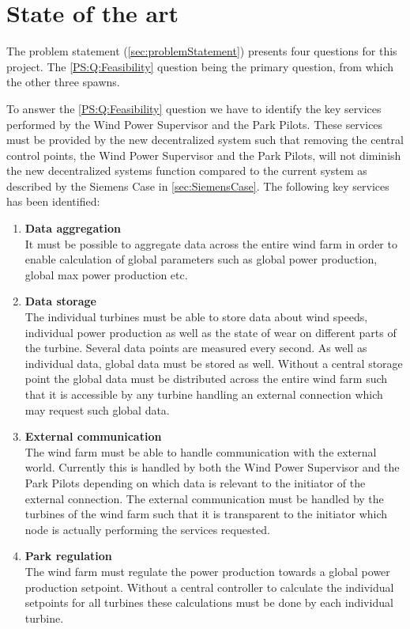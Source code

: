 \chapter{State of the art}\label{cha:stateOfTheArt}

The problem statement (\cref{sec:problemStatement}) presents four questions for this project. The \ref{PS:Q:Feasibility} question being the primary question, from which the other three spawns. 

To answer the \ref{PS:Q:Feasibility} question we have to identify the key services performed by the Wind Power Supervisor and the Park Pilots. These services must be provided by the new decentralized system such that removing the central control points, the Wind Power Supervisor and the Park Pilots, will not diminish the new decentralized systems function compared to the current system as described by the Siemens Case in \cref{sec:SiemensCase}. The following key services has been identified:

\begin{enumerate}[label=\textbf{\alph*.}, ref=\textit{\alph*}]
\item \label{Analysis:need:a} \textbf{Data aggregation} \\
	It must be possible to aggregate data across the entire wind farm in order to enable calculation of global parameters such as global power production, global max power production etc. 

\item \label{Analysis:need:b} \textbf{Data storage} \\
	The individual turbines must be able to store data about wind speeds, individual power production as well as the state of wear on different parts of the turbine. Several data points are measured every second. As well as individual data, global data must be stored as well. Without a central storage point the global data must be distributed across the entire wind farm such that it is accessible by any turbine handling an external connection which may request such global data.

\item \label{Analysis:need:c} \textbf{External communication} \\
	The wind farm must be able to handle communication with the external world. Currently this is handled by both the Wind Power Supervisor and the Park Pilots depending on which data is relevant to the initiator of the external connection. The external communication must be handled by the turbines of the wind farm such that it is transparent to the initiator which node is actually performing the services requested.

\item \label{Analysis:need:d} \textbf{Park regulation} \\
	The wind farm must regulate the power production towards a global power production setpoint. Without a central controller to calculate the individual setpoints for all turbines these calculations must be done by each individual turbine.
	
\end{enumerate}

